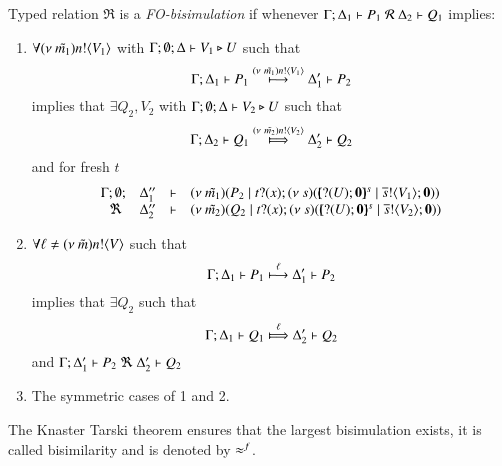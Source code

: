 \begin{definition}\rm
	\label{def:FO_bisim}
	Typed relation 
	$\Re$ is a {\em FO-bisimulation} if whenever
	$\horel{\Gamma}{\Delta_1}{P_1}{\ \mathcal{R}\ }{\Delta_2}{Q_1}$ implies:
	\begin{enumerate}
		\item	$\forall (\nu\ \tilde{m_1}) n ! \langle V_1 \rangle$ with $\Gamma; \emptyset; \Delta \vdash V_1 \triangleright U$ such that
			\[
				\Gamma; \Delta_1 \vdash P_1 \stackrel{(\nu\ \tilde{m_1}) n ! \langle V_1 \rangle}{\longmapsto} \Delta_1' \vdash P_2
			\]
			implies that $\exists Q_2, V_2$ with $\Gamma; \emptyset; \Delta \vdash V_2 \triangleright U$ such that
			\[
				\horel{\Gamma}{\Delta_2}{Q_1}{\Hby{\news{\tilde{m_2}} \bactout{n}{V_2}}}{\Delta_2'}{Q_2}
			\]
			and for fresh $t$
			\[
				\mhorel{\Gamma}{\Delta_1''}{\newsp{\tilde{m_1}}{P_2 \Par \fotrigger{t}{x}{s}{\btinp{U} \inact}{V_1}}}
				{\ \Re\ }
				{\Delta_2''}{}{\newsp{\tilde{m_2}}{Q_2 \Par \fotrigger{t}{x}{s}{\btinp{U} \inact}{V_2}}}
			\]
%
		\item	$\forall \ell \not= (\nu\ \tilde{m}) n ! \langle V \rangle$ such that
			\[
				\Gamma; \Delta_1 \vdash P_1 \stackrel{\ell}{\longmapsto} \Delta_1' \vdash P_2
			\]
			implies that $\exists Q_2$ such that 
			\[
				\horel{\Gamma}{\Delta_1}{Q_1}{\Hby{\ell}}{\Delta_2'}{Q_2}
			\]
			and
			$\horel{\Gamma}{\Delta_1'}{P_2}{\ \Re\ }{\Delta_2'}{Q_2}$

		\item	The symmetric cases of 1 and 2.
	\end{enumerate}
	The Knaster Tarski theorem ensures that the largest bisimulation exists,
	it is called bisimilarity and is denoted by $\approx^{f}$.
\end{definition}


